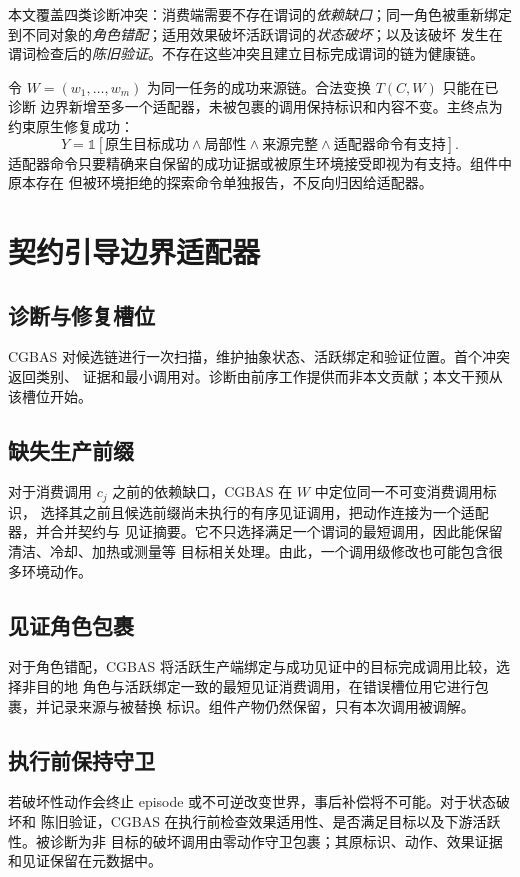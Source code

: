 \documentclass[10pt]{article}
\begin{document}
本文覆盖四类诊断冲突：消费端需要不存在谓词的\emph{依赖缺口}；同一角色被重新绑定
到不同对象的\emph{角色错配}；适用效果破坏活跃谓词的\emph{状态破坏}；以及该破坏
发生在谓词检查后的\emph{陈旧验证}。不存在这些冲突且建立目标完成谓词的链为健康链。

令 $W=(w_1,\ldots,w_m)$ 为同一任务的成功来源链。合法变换 $T(C,W)$ 只能在已诊断
边界新增至多一个适配器，未被包裹的调用保持标识和内容不变。主终点为约束原生修复成功：
\begin{equation}
Y=\mathbb{1}[\text{原生目标成功}\land\text{局部性}\land
\text{来源完整}\land\text{适配器命令有支持}].
\end{equation}
适配器命令只要精确来自保留的成功证据或被原生环境接受即视为有支持。组件中原本存在
但被环境拒绝的探索命令单独报告，不反向归因给适配器。

\section{契约引导边界适配器}

\subsection{诊断与修复槽位}
CGBAS 对候选链进行一次扫描，维护抽象状态、活跃绑定和验证位置。首个冲突返回类别、
证据和最小调用对。诊断由前序工作提供而非本文贡献；本文干预从该槽位开始。

\subsection{缺失生产前缀}
对于消费调用 $c_j$ 之前的依赖缺口，CGBAS 在 $W$ 中定位同一不可变消费调用标识，
选择其之前且候选前缀尚未执行的有序见证调用，把动作连接为一个适配器，并合并契约与
见证摘要。它不只选择满足一个谓词的最短调用，因此能保留清洁、冷却、加热或测量等
目标相关处理。由此，一个调用级修改也可能包含很多环境动作。

\subsection{见证角色包裹}
对于角色错配，CGBAS 将活跃生产端绑定与成功见证中的目标完成调用比较，选择非目的地
角色与活跃绑定一致的最短见证消费调用，在错误槽位用它进行包裹，并记录来源与被替换
标识。组件产物仍然保留，只有本次调用被调解。

\subsection{执行前保持守卫}
若破坏性动作会终止 episode 或不可逆改变世界，事后补偿将不可能。对于状态破坏和
陈旧验证，CGBAS 在执行前检查效果适用性、是否满足目标以及下游活跃性。被诊断为非
目标的破坏调用由零动作守卫包裹；其原标识、动作、效果证据和见证保留在元数据中。
\end{document}
